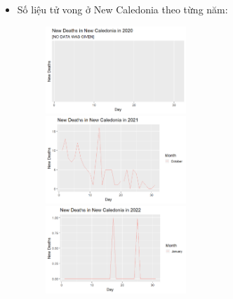 \documentclass[a4paper]{article}
\theoremstyle{definition}
\begin{document}
\begin{enumerate}[i)]
\begin{enumerate}[1]
     \begin{itemize}
   \item{Số liệu tử vong ở New Caledonia theo từng năm:}\\
     \begin{figure}[hpt!]
    \includegraphics[width=0.5\textwidth]{Images/2.4v.png}
    \includegraphics[width=0.5\textwidth]{Images/2.5v.png}
    \includegraphics[width=0.5\textwidth]{Images/2.6v.png}
  \end{figure}
    \end{itemize}
    

\end{enumerate}
\end{enumerate}
\end{document}
